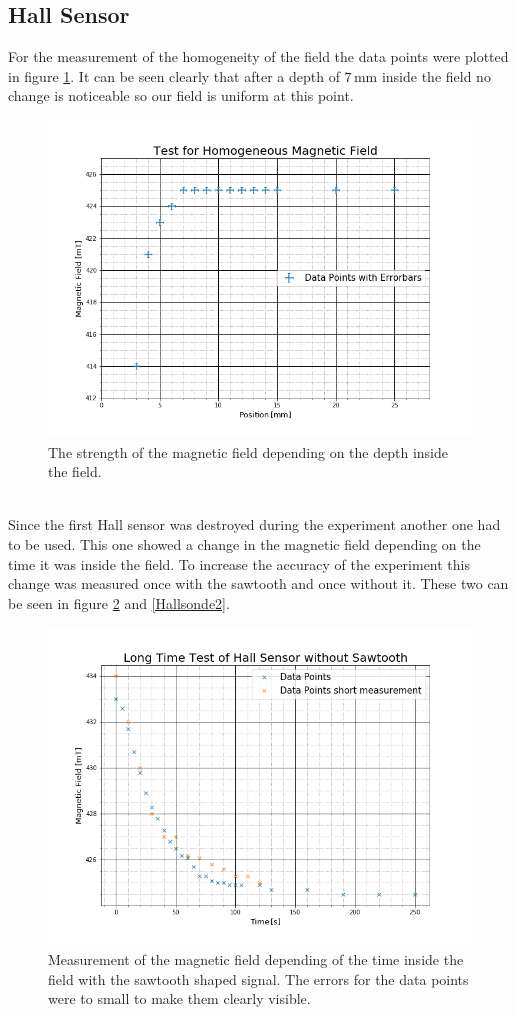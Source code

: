 \subsection{Hall Sensor}
For the measurement of the homogeneity of the field the data points were plotted in figure \ref{Homogen}. It can be seen clearly that after a depth of $7$\,mm inside the field no change is noticeable so our field is uniform at this point.
\begin{figure}[ht]
	\includegraphics[scale=0.5]{Bild/Hallsonde}
	\centering
	\caption{The strength of the magnetic field depending on the depth inside the field.}
	\label{Homogen}
\end{figure}\\
Since the first Hall sensor was destroyed during the experiment another one had to be used. This one showed a change in the magnetic field depending on the time it was inside the field. To increase the accuracy of the experiment this change was measured once with the sawtooth and once without it. These two can be seen in figure \ref{Hallsonde1} and \ref{Hallsonde2}.
\begin{figure}[ht]
	\includegraphics[scale=0.5]{Bild/Hallsonde1}
	\centering
	\caption{Measurement of the magnetic field depending of the time inside the field with the sawtooth shaped signal. The errors for the data points were to small to make them clearly visible.}
	\label{Hallsonde1}
\end{figure}
